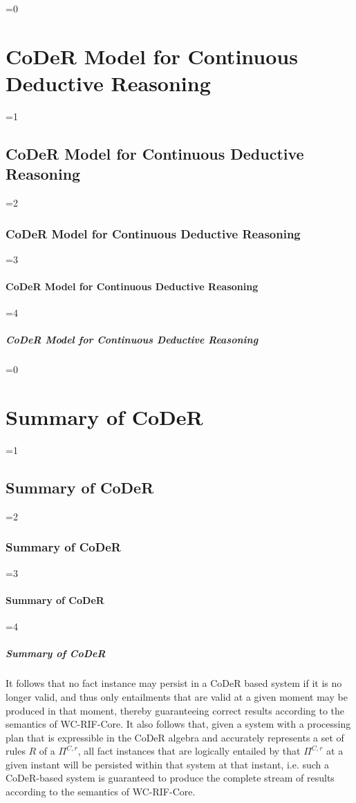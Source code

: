 \documentclass[twocolumn,preprint,3p,number]{elsarticle}
\theoremstyle{plain}
\theoremstyle{definition}
\newcounter{nestingdepth}
\newenvironment{nestedsection}[2]{
  \ifnum\value{nestingdepth}=0
    \chapter{#1}
  \else
    \ifnum\value{nestingdepth}=1
      \section{#1}
    \else
      \ifnum\value{nestingdepth}=2
        \subsection{#1}
      \else
        \ifnum\value{nestingdepth}=3
          \subsubsection{#1}
        \else
          \ifnum\value{nestingdepth}=4
            \paragraph{#1}
          \else
            \PackageError{nestedsections}{Maximum nesting level exceeded!}{uh oh!}
          \fi
        \fi
      \fi
    \fi
  \fi
  \addtocounter{nestingdepth}{1}
  \label{sec:#2}
}{\addtocounter{nestingdepth}{-1}}
\begin{document}
\begin{nestedsection}{CoDeR Model for Continuous Deductive Reasoning}{model}
\begin{nestedsection}{Summary of CoDeR}{CoDeR: summary}
    It follows that no fact instance may persist in a CoDeR based system if it is no longer valid, and thus only entailments that are valid at a given moment may be produced in that moment, thereby guaranteeing correct results according to the semantics of WC-RIF-Core.
    It also follows that, given a system with a processing plan that is expressible in the CoDeR algebra and accurately represents a set of rules $R$ of a $\Pi^{C,r}$, all fact instances that are logically entailed by that $\Pi^{C,r}$ at a given instant will be persisted within that system at that instant,
    i.e. such a CoDeR-based system is guaranteed to produce the complete stream of results according to the semantics of WC-RIF-Core.
  \end{nestedsection}
\end{nestedsection}
\end{document}
